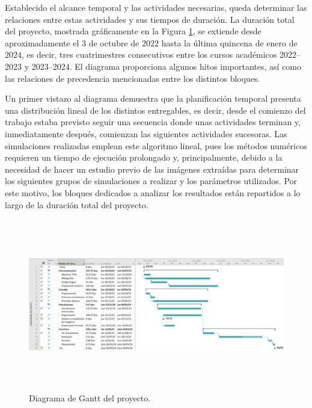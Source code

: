 Establecido el alcance temporal y las actividades necesarias, queda determinar las relaciones entre estas actividades y sus tiempos de duración. La duración total del proyecto, mostrada gráficamente en la Figura \ref{fig:ch9_gantt}, se extiende desde aproximadamente el $3$ de octubre de $2022$ hasta la última quincena de enero de $2024$, es decir, tres cuatrimestres consecutivos entre los cursos académicos \numrange{2022}{2023} y \numrange{2023}{2024}. El diagrama proporciona algunos hitos importantes, así como las relaciones de precedencia mencionadas entre los distintos bloques.

Un primer vistazo al diagrama demuestra que la planificación temporal presenta una distribución lineal de los distintos entregables, es decir, desde el comienzo del trabajo estaba previsto seguir una secuencia donde unas actividades terminan y, inmediatamente después, comienzan las siguientes actividades sucesoras. Las simulaciones realizadas emplean este algoritmo lineal, pues los métodos numéricos requieren un tiempo de ejecución prolongado y, principalmente, debido a la necesidad de hacer un estudio previo de las imágenes extraídas para determinar los siguientes grupos de simulaciones a realizar y los parámetros utilizados. Por este motivo, los bloques dedicados a analizar los resultados están repartidos a lo largo de la duración total del proyecto. 

\begin{figure}[htbp]
  \centering
  \includegraphics[height=7.5cm,width=\textwidth]{Figuras/ch9_gantt.pdf}
  \caption{Diagrama de Gantt del proyecto.}
  \label{fig:ch9_gantt}
\end{figure}


